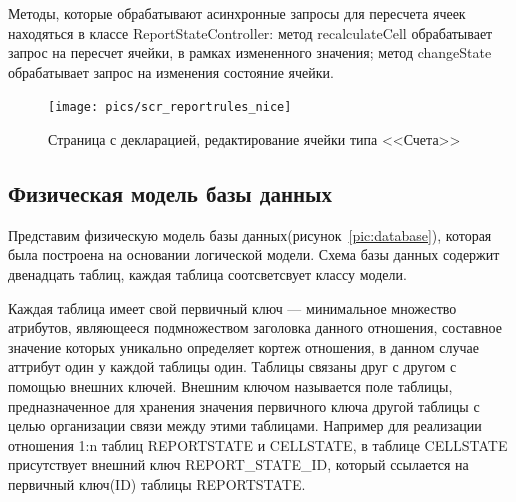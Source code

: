 \documentclass[14pt,a4paper]{reportmod}
\begin{document}
Методы, которые обрабатывают асинхронные запросы для пересчета ячеек находяться в классе ReportStateController: метод recalculateCell обрабатывает запрос на пересчет ячейки, в рамках измененного значения; метод changeState обрабатывает запрос на изменения состояние ячейки.


\begin{figure}
  \centering
  \texttt{[image: pics/scr\_reportrules\_nice]}
  \caption{Страница с декларацией, редактирование ячейки типа <<Счета>>}
  \label{pic:report_scr}
\end{figure}

\subsection{Физическая модель базы данных}
Представим физическую модель базы данных(рисунок~\ref{pic:database}), которая была построена на основании логической модели. Схема базы данных содержит двенадцать таблиц, каждая таблица соотсветсвует классу модели.


Каждая таблица имеет свой первичный ключ --- минимальное множество атрибутов, являющееся подмножеством заголовка данного отношения, составное значение которых уникально определяет кортеж отношения, в данном случае аттрибут один у каждой таблицы один. Таблицы связаны друг с другом с помощью внешних ключей. Внешним ключом называется поле таблицы, предназначенное для хранения значения первичного ключа другой таблицы с целью организации связи между этими таблицами. Например для реализации отношения 1:n таблиц REPORTSTATE и CELLSTATE, в таблице CELLSTATE присутствует внешний ключ REPORT\_STATE\_ID, который ссылается на первичный ключ(ID) таблицы REPORTSTATE.
\end{document}
